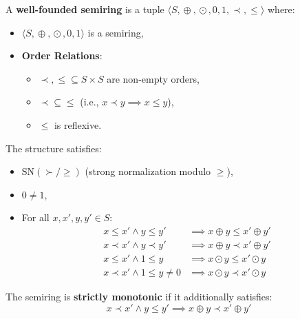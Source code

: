 \begin{definition}
    \label{def:well_founded_semiring}
    A \textbf{well-founded semiring} is a tuple \(\langle S, \mathop{\oplus}, \mathop{\odot}, 0, 1, \prec, \leq \rangle\) where:
    \begin{itemize}
        \item  \(\langle S, \mathop{\oplus}, \mathop{\odot}, 0, 1 \rangle\) is a semiring,
        \item \textbf{Order Relations}: 
            \begin{itemize}
                \item \(\prec, \leq \mathop{\subseteq} S \mathop{\times} S\) are non-empty orders,
                \item \(\mathop{\prec} \mathop{\subseteq} \leq\) (i.e., \(x \mathop{\prec} y \implies x \leq y\)),
                \item \(\leq\) is reflexive.
            \end{itemize}
    \end{itemize}
    The structure satisfies:
    \begin{itemize}
        \item \(\text{SN}(\mathop{\succ} / \mathop{\geq})\) (strong normalization modulo \(\geq\)),
        \item \(0 \mathop{\neq} 1\),
        \item For all \(x, x', y, y' \mathop{\in} S\):
            \begin{align*}
                x \leq x' \mathop{\land} y \leq y' &\implies x \mathop{\oplus} y \leq x' \mathop{\oplus} y' \tag{S1} \label{ax:S1} \\
                x \mathop{\prec} x' \mathop{\land} y \mathop{\prec} y' &\implies x \mathop{\oplus} y \mathop{\prec} x' \mathop{\oplus} y' \tag{S2} \label{ax:S2} \\
                x \leq x' \mathop{\land} 1 \leq y &\implies x \mathop{\odot} y \leq x' \mathop{\odot} y \tag{S3} \label{ax:S3} \\
                x \mathop{\prec} x' \mathop{\land} 1 \leq y \mathop{\neq} 0 &\implies x \mathop{\odot} y \mathop{\prec} x' \mathop{\odot} y \tag{S4} \label{ax:S4}
            \end{align*}
    \end{itemize}
    The semiring is \textbf{strictly monotonic} if it additionally satisfies:
    \[
        x \mathop{\prec} x' \mathop{\land} y \leq y' \implies x \mathop{\oplus} y \mathop{\prec} x' \mathop{\oplus} y' \tag{S5} \label{ax:S5}
    \]
\end{definition}

